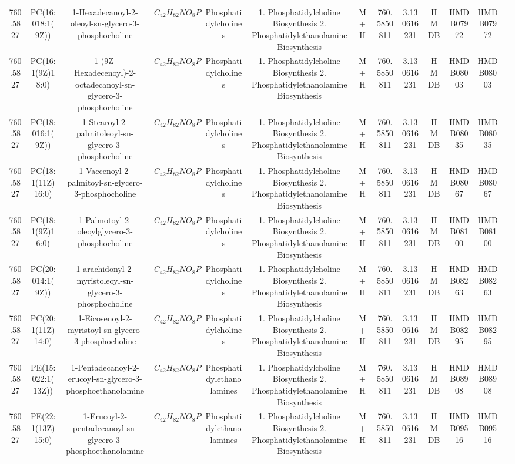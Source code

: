 \documentclass{WileyMSP-template}
\begin{document}
\begin{landscape}
\begin{table}
\begin{adjustbox}{center}
{\begin{tabular}{|c|c|c|c|c|c|c|c|c|c|c|c|c|}
            760.5827 & PC(16:018:1(9Z)) & 1-Hexadecanoyl-2-oleoyl-sn-glycero-3-phosphocholine & $ C_{42}H_{82}NO_{8}P $ & Phosphatidylcholines & 1. Phosphatidylcholine Biosynthesis 2. Phosphatidylethanolamine Biosynthesis & M+H & 760.5850811 & 3.130616231 & HMDB & HMDB07972 & HMDB07972\\
            760.5827 & PC(16:1(9Z)18:0) & 1-(9Z-Hexadecenoyl)-2-octadecanoyl-sn-glycero-3-phosphocholine & $ C_{42}H_{82}NO_{8}P $ & Phosphatidylcholines & 1. Phosphatidylcholine Biosynthesis 2. Phosphatidylethanolamine Biosynthesis & M+H & 760.5850811 & 3.130616231 & HMDB & HMDB08003 & HMDB08003\\
            760.5827 & PC(18:016:1(9Z)) & 1-Stearoyl-2-palmitoleoyl-sn-glycero-3-phosphocholine & $ C_{42}H_{82}NO_{8}P $ & Phosphatidylcholines & 1. Phosphatidylcholine Biosynthesis 2. Phosphatidylethanolamine Biosynthesis & M+H & 760.5850811 & 3.130616231 & HMDB & HMDB08035 & HMDB08035\\
            760.5827 & PC(18:1(11Z)16:0) & 1-Vaccenoyl-2-palmitoyl-sn-glycero-3-phosphocholine & $ C_{42}H_{82}NO_{8}P $ & Phosphatidylcholines & 1. Phosphatidylcholine Biosynthesis 2. Phosphatidylethanolamine Biosynthesis & M+H & 760.5850811 & 3.130616231 & HMDB & HMDB08067 & HMDB08067\\
            760.5827 & PC(18:1(9Z)16:0) & 1-Palmotoyl-2-oleoylglycero-3-phosphocholine & $ C_{42}H_{82}NO_{8}P $ & Phosphatidylcholines & 1. Phosphatidylcholine Biosynthesis 2. Phosphatidylethanolamine Biosynthesis & M+H & 760.5850811 & 3.130616231 & HMDB & HMDB08100 & HMDB08100\\
            760.5827 & PC(20:014:1(9Z)) & 1-arachidonyl-2-myristoleoyl-sn-glycero-3-phosphocholine & $ C_{42}H_{82}NO_{8}P $ & Phosphatidylcholines & 1. Phosphatidylcholine Biosynthesis 2. Phosphatidylethanolamine Biosynthesis & M+H & 760.5850811 & 3.130616231 & HMDB & HMDB08263 & HMDB08263\\
            760.5827 & PC(20:1(11Z)14:0) & 1-Eicosenoyl-2-myristoyl-sn-glycero-3-phosphocholine & $ C_{42}H_{82}NO_{8}P $ & Phosphatidylcholines & 1. Phosphatidylcholine Biosynthesis 2. Phosphatidylethanolamine Biosynthesis & M+H & 760.5850811 & 3.130616231 & HMDB & HMDB08295 & HMDB08295\\
            760.5827 & PE(15:022:1(13Z)) & 1-Pentadecanoyl-2-erucoyl-sn-glycero-3-phosphoethanolamine & $ C_{42}H_{82}NO_{8}P $ & Phosphatidylethanolamines & 1. Phosphatidylcholine Biosynthesis 2. Phosphatidylethanolamine Biosynthesis & M+H & 760.5850811 & 3.130616231 & HMDB & HMDB08908 & HMDB08908\\
            760.5827 & PE(22:1(13Z)15:0) & 1-Erucoyl-2-pentadecanoyl-sn-glycero-3-phosphoethanolamine & $ C_{42}H_{82}NO_{8}P $ & Phosphatidylethanolamines & 1. Phosphatidylcholine Biosynthesis 2. Phosphatidylethanolamine Biosynthesis & M+H & 760.5850811 & 3.130616231 & HMDB & HMDB09516 & HMDB09516\\
            \bottomrule
            

\end{tabular}}
\end{adjustbox}
\end{table}
\end{landscape}
\end{document}
